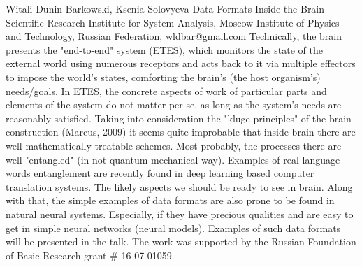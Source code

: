\documentclass[10pt,fleqn,openany]{book} %
\begin{document}
\begin{enumerate}
	\paperabstract
		{Witali Dunin-Barkowski, Ksenia Solovyeva}
		{Data Formats Inside the Brain}
		{Scientific Research Institute for System Analysis, Moscow Institute of Physics and Technology, Russian Federation, wldbar@gmail.com}
		{
			Technically, the brain presents the "end-to-end" system (ETES), which monitors the state of the external world using numerous receptors and acts back to it via multiple effectors to impose the world's states, comforting the brain's (the host organism's) needs/goals. In ETES, the concrete aspects of work of particular parts and elements of the system do not matter per se, as long as the system's needs are reasonably satisfied. Taking into consideration the "kluge principles" of the brain construction (Marcus, 2009) it seems quite improbable that inside brain there are well mathematically-treatable schemes. Most probably, the processes there are well "entangled" (in not quantum mechanical way). Examples of real language words entanglement are recently found in deep learning based computer translation systems. The likely aspects we should be ready to see in brain. Along with that, the simple examples of data formats are also prone to be found in natural neural systems. Especially, if they have precious qualities and are easy to get in simple neural networks (neural models). Examples of such data formats will be presented in the talk. The work was supported by the Russian Foundation of Basic Research grant \# 16-07-01059.}
		

\end{enumerate}
\end{document}
